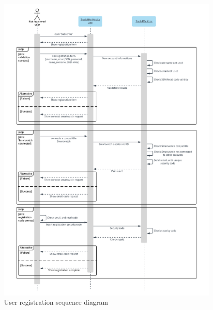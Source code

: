 \begin{figure}[H]
  \includegraphics[width=\textwidth,height=\textheight,keepaspectratio]{assets/sequence/UserRegistration.pdf}
  \caption{User registration sequence diagram}
  \label{fig:UserRegistrationSequence}
\end{figure}



\newpage
